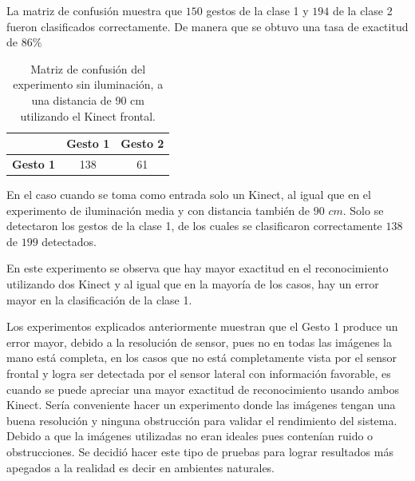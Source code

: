 \begin{itemize}
La matriz de confusión muestra que $150$ gestos de la clase 1 y $194$ de la clase 2 fueron clasificados correctamente. De manera que se obtuvo una tasa de exactitud de $86 \%$ 

\begin{table}[h!] 
\begin{center}
\caption{Matriz de confusión del experimento sin iluminación, a una distancia de 90 cm utilizando el Kinect frontal.}
\label{table:90LnoK1} 
\renewcommand{\arraystretch}{1.2}
\begin{tabular}{ r || c  c } 
 
        & \textbf{Gesto 1} & \textbf{Gesto 2} \\ \hline \hline  
\textbf{Gesto 1} & 138     &  61     \\ 
\end{tabular}
\end{center} 
\end{table} 

En el caso cuando se toma como entrada solo un Kinect, al igual que en el experimento de iluminación media y con distancia también de $90$ $cm$. Solo se detectaron los gestos de la clase 1, de los cuales se clasificaron correctamente $138$ de $199$ detectados. 

En este experimento se observa que hay mayor exactitud en el reconocimiento utilizando dos Kinect y al igual que en la mayoría de los casos, hay un error mayor en la clasificación de la clase 1. 


\end{itemize}

Los experimentos explicados anteriormente muestran que el Gesto 1 produce un error mayor, debido a la resolución de sensor, pues no en todas las imágenes la mano est\'a completa, en los casos que no est\'a completamente vista por el sensor frontal y logra ser detectada por el sensor lateral con información favorable, es cuando se puede apreciar una mayor exactitud de reconocimiento usando ambos Kinect. 
Ser\'ia conveniente hacer un experimento donde las imágenes tengan una buena resolución y ninguna obstrucción para validar el rendimiento del sistema. Debido a que la imágenes utilizadas no eran ideales pues contenían  ruido o obstrucciones. Se decidió hacer este tipo de pruebas para lograr resultados m\'as apegados a la realidad es decir en ambientes naturales. 
  



